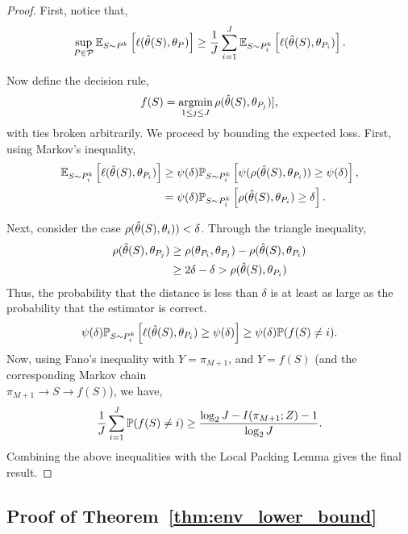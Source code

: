 \begin{proof}
First, notice that,
\[
\sup_{P \in \mathcal{P}}\mathbb{E}_{S\sim P^k}\left[ \ell(\hat{\theta}_{}(S), \theta_{P}) \right] \geq \dfrac{1}{J}\sum_{i=1}^J \mathbb{E}_{S\sim P_i^k}\left[ \ell(\hat{\theta}_{}(S), \theta_{P_i}) \right].
\]

Now define the decision rule,
\[f(S) = \mathop{\textrm{argmin}}_{1\leq j \leq J}\rho(\hat{\theta}(S), \theta_{P_j})],\]
with ties broken arbitrarily. We proceed by bounding the expected loss. First, using Markov's inequality,
\begin{align*}
\mathbb{E}_{S\sim P_i^k}\left[ \ell(\hat{\theta}_{}(S), \theta_{P_i}) \right] &\geq \psi(\delta)\mathbb{P}_{S\sim P^k_i}\left[\psi(\rho(\hat{\theta}(S), \theta_{P_i})) \geq \psi(\delta) \right], \\
&= \psi(\delta)\mathbb{P}_{S\sim P^k_i}\left[\rho(\hat{\theta}(S), \theta_{P_i}) \geq \delta \right].
\end{align*}

Next, consider the case $\rho(\hat{\theta}(S), \theta_{i})) < \delta$. Through the triangle inequality,
\begin{align*}
    \rho(\hat{\theta}(S), \theta_{P_j}) &\geq \rho(\theta_{P_i}, \theta_{P_j}) - \rho(\hat{\theta}(S), \theta_{P_i}) \\
    &\geq 2\delta - \delta > \rho(\hat{\theta}(S), \theta_{P_i})
\end{align*}
Thus, the probability that the distance is less than $\delta$ is at least as large as the probability that the estimator is correct.
\[
\psi(\delta)\mathbb{P}_{S\sim P^k_i}\left[ \ell(\hat{\theta}(S), \theta_{P_i}) \geq \psi(\delta) \right] \geq \psi(\delta) \mathbb{P}(f(S) \neq i). 
\]
Now, using Fano's inequality with $Y = \pi_{M+1}$, and $\hat{Y} = f(S)$ (and the corresponding Markov chain\\$\pi_{M+1} \rightarrow S \rightarrow f(S)$), we have,
\[
\dfrac{1}{J}\sum_{i=1}^J \mathbb{P}(f(S) \neq i) \geq \dfrac{\log_2 J - I(\pi_{M+1}; Z) - 1}{\log_2 J}.
\]
Combining the above inequalities with the Local Packing Lemma gives the final result.
\end{proof}

\subsection{Proof of Theorem~\ref{thm:env_lower_bound}}

\envlbound*

